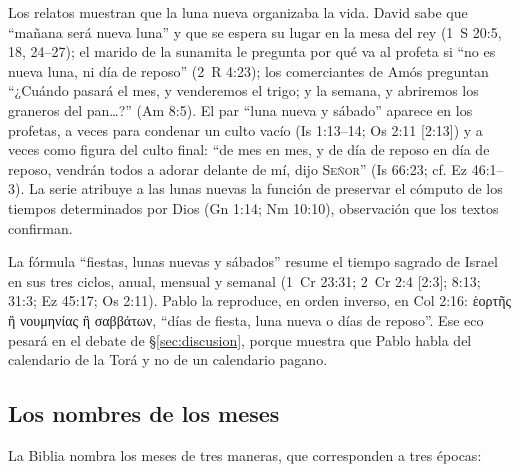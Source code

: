 \documentclass[11pt,letterpaper]{article}
\newcommand{\grc}[1]{\foreignlanguage{ancientgreek}{#1}}
\newcommand{\SENOR}{\textsc{Señor}}
\begin{document}
Los relatos muestran que la luna nueva organizaba la vida. David sabe que ``mañana será nueva luna'' y que se espera su lugar en la mesa del rey (1~S 20:5, 18, 24--27); el marido de la sunamita le pregunta por qué va al profeta si ``no es nueva luna, ni día de reposo'' (2~R 4:23); los comerciantes de Amós preguntan ``¿Cuándo pasará el mes, y venderemos el trigo; y la semana, y abriremos los graneros del pan\ldots?'' (Am 8:5). El par ``luna nueva y sábado'' aparece en los profetas, a veces para condenar un culto vacío (Is 1:13--14; Os 2:11 [2:13]) y a veces como figura del culto final: ``de mes en mes, y de día de reposo en día de reposo, vendrán todos a adorar delante de mí, dijo \SENOR'' (Is 66:23; cf. Ez 46:1--3). La serie atribuye a las lunas nuevas la función de preservar el cómputo de los tiempos determinados por Dios (Gn 1:14; Nm 10:10), observación que los textos confirman.

La fórmula ``fiestas, lunas nuevas y sábados'' resume el tiempo sagrado de Israel en sus tres ciclos, anual, mensual y semanal (1~Cr 23:31; 2~Cr 2:4 [2:3]; 8:13; 31:3; Ez 45:17; Os 2:11). Pablo la reproduce, en orden inverso, en Col 2:16: \grc{ἑορτῆς ἢ νουμηνίας ἢ σαββάτων}, ``días de fiesta, luna nueva o días de reposo''. Ese eco pesará en el debate de §\ref{sec:discusion}, porque muestra que Pablo habla del calendario de la Torá y no de un calendario pagano.

\subsection{Los nombres de los meses}
La Biblia nombra los meses de tres maneras, que corresponden a tres épocas:
\end{document}
